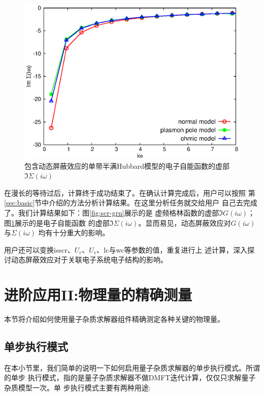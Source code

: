 \begin{figure}
\centering
\includegraphics{figure/scr-sgm.eps}
\caption{包含动态屏蔽效应的单带半满Hubbard模型的电子自能函数的虚部$\Im \Sigma(i\omega)$} 
\label{fig:scr-sgm}
\end{figure}

在漫长的等待过后，计算终于成功结束了。在确认计算完成后，用户可以按照
第\ref{sec:basic}节中介绍的方法分析计算结果。在这里分析任务就交给用户
自己去完成了。我们计算结果如下：图\ref{fig:scr-grn}展示的是
虚频格林函数的虚部$\Im G(i\omega)$；图\ref{fig:scr-sgm}展示的是电子自能函数
的虚部$\Im \Sigma(i\omega)$。显而易见，动态屏蔽效应对$G(i\omega)$与$\Sigma(i\omega)$
均有十分重大的影响。

用户还可以变换isscr、$U_{c}$、$U_{v}$、lc与wc等参数的值，重复进行上
述计算，深入探讨动态屏蔽效应对于关联电子系统电子结构的影响。

\section{进阶应用II:物理量的精确测量}
\label{sec:stage2}

本节将介绍如何使用量子杂质求解器组件精确测定各种关键的物理量。

\subsection{单步执行模式}
\label{subsec:single}

在本小节里，我们简单的说明一下如何启用量子杂质求解器的单步执行模式。所谓的单步
执行模式，指的是量子杂质求解器不做DMFT迭代计算，仅仅只求解量子杂质模型一次。单
步执行模式主要有两种用途:


